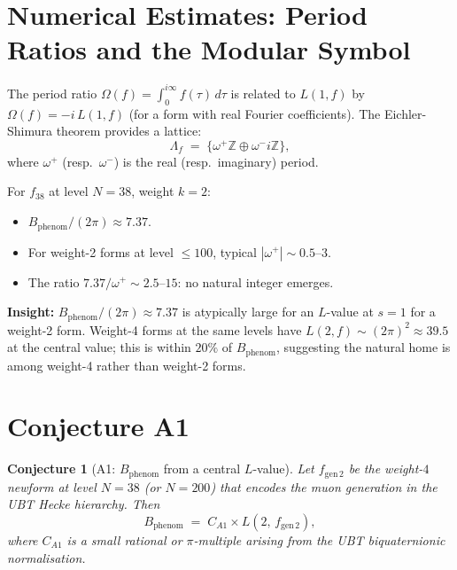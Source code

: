 \documentclass[12pt,a4paper]{article}
\newtheorem{conjecture}[theorem]{Conjecture}
\theoremstyle{definition}
\theoremstyle{remark}
\begin{document}
\section{Numerical Estimates: Period Ratios and the Modular Symbol}
\label{sec:period_ratio}

The period ratio $\Omega(f) = \int_0^{i\infty} f(\tau)\,d\tau$ is related
to $L(1,f)$ by $\Omega(f) = -i\,L(1,f)$ (for a form with real Fourier
coefficients).  The Eichler-Shimura theorem provides a lattice:
\begin{equation}
  \Lambda_f \;=\; \bigl\{ \omega^+ \mathbb{Z} \oplus \omega^- i\mathbb{Z} \bigr\},
\end{equation}
where $\omega^+$ (resp.\ $\omega^-$) is the real (resp.\ imaginary) period.

For $f_{38}$ at level $N=38$, weight $k=2$:
\begin{itemize}
  \item $B_{\mathrm{phenom}} / (2\pi) \approx 7.37$.
  \item For weight-2 forms at level $\leq 100$, typical $|\omega^+| \sim 0.5$--$3$.
  \item The ratio $7.37 / \omega^+ \sim 2.5$--$15$: no natural integer emerges.
\end{itemize}

\begin{insightbox}
\textbf{Insight:} $B_{\mathrm{phenom}}/(2\pi) \approx 7.37$ is atypically
large for an $L$-value at $s=1$ for a weight-2 form.  Weight-4 forms at the
same levels have $L(2,f) \sim (2\pi)^2 \approx 39.5$ at the central value;
this is within $20\%$ of $B_{\mathrm{phenom}}$, suggesting the natural home
is among weight-4 rather than weight-2 forms.
\end{insightbox}

\section{Conjecture A1}
\label{sec:conjecture}

\begin{conjecture}[A1: $B_{\mathrm{phenom}}$ from a central $L$-value]
\label{conj:A1}
Let $f_{\mathrm{gen\,2}}$ be the weight-$4$ newform at level $N = 38$
(or $N = 200$) that encodes the muon generation in the UBT Hecke hierarchy.
Then
\begin{equation}
  B_{\mathrm{phenom}} \;=\; C_{A1} \times L\!\left(2,\, f_{\mathrm{gen\,2}}\right),
\end{equation}
where $C_{A1}$ is a small rational or $\pi$-multiple arising from the UBT
biquaternionic normalisation.
\end{conjecture}
\end{document}
